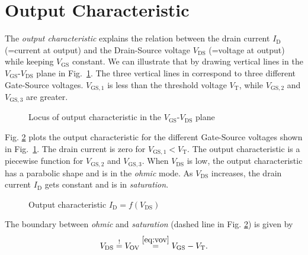 \documentclass{article}[11pt]
\begin{document}
\section{Output Characteristic}

The \textit{output characteristic} explains the relation between the drain 
current $I_{\mathrm{D}}$ (=current at output) and the Drain-Source 
voltage $V_{\mathrm{DS}}$ (=voltage at output) while keeping 
$V_{\mathrm{GS}}$ constant.
We can illustrate that by drawing vertical lines in the 
$V_{\mathrm{GS}}$-$V_{\mathrm{DS}}$ plane in 
Fig.~\ref{fig:squarelawregionplotout}.
The three vertical lines in correspond to 
three different Gate-Source voltages.
$V_{\mathrm{GS,1}}$ is less than the threshold voltage 
$V_{\mathrm{T}}$, while $V_{\mathrm{GS,2}}$ and 
$V_{\mathrm{GS,3}}$ are greater.

\begin{figure}[H]
  \centering
  \begin{tikzpicture}[scale=1.2]
    
  \end{tikzpicture}
  \caption{Locus of output characteristic in the $V_{\mathrm{GS}}$-$V_{\mathrm{DS}}$ plane}
  \label{fig:squarelawregionplotout}
\end{figure}

Fig. \ref{fig:squarelawout} plots the output characteristic for the different
Gate-Source voltages shown in Fig.~\ref{fig:squarelawregionplotout}.
The drain current is zero for $V_{\mathrm{GS,1}}<V_{\mathrm{T}}$.
The output characteristic is a piecewise function for $V_{\mathrm{GS,2}}$
and $V_{\mathrm{GS,3}}$.
When $V_{\mathrm{DS}}$ is low, the output characteristic has a 
parabolic shape and is in the \textit{ohmic} mode.
As $V_{\mathrm{DS}}$ increases, the drain current $I_{\mathrm{D}}$
gets constant and is in \textit{saturation}.

\begin{figure}[H]
  \centering
  \begin{tikzpicture}[scale=1.2]
    
  \end{tikzpicture}
  \caption{Output characteristic $I_{\mathrm{D}} = f(V_{\mathrm{DS}})$}
  \label{fig:squarelawout}
\end{figure}

The boundary between \textit{ohmic} and \textit{saturation} 
(dashed line in Fig. \ref{fig:squarelawout}) is given by 
\begin{equation}
  V_{\mathrm{DS}} \stackrel{!}{=} V_{\mathrm{OV}} 
                  \stackrel{\eqref{eq:vov}}{=} V_{\mathrm{GS}} - V_{\mathrm{T}}.
\end{equation}
\end{document}
